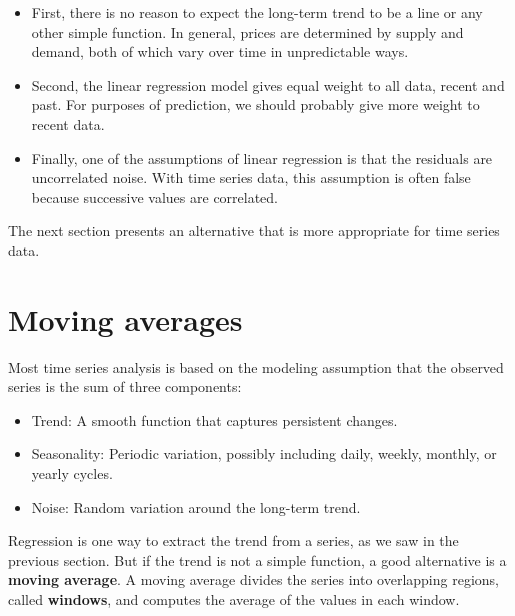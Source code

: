 \documentclass[12pt]{book}
\theoremstyle{exercise}
\begin{document}
\begin{itemize}

\item First, there is no reason to expect the long-term trend to be a
  line or any other simple function.  In general, prices are
  determined by supply and demand, both of which vary over time in
  unpredictable ways.%

\item Second, the linear regression model gives equal weight to all
  data, recent and past.  For purposes of prediction, we should
  probably give more weight to recent data.%

\item Finally, one of the assumptions of linear regression is that the
  residuals are uncorrelated noise.  With time series data, this
  assumption is often false because successive values are correlated.%

\end{itemize}

The next section presents an alternative that is more appropriate
for time series data.


\section{Moving averages}

Most time series analysis is based on the modeling assumption that the
observed series is the sum of three components:%
%

\begin{itemize}

\item Trend: A smooth function that captures persistent changes.%

\item Seasonality: Periodic variation, possibly including daily,
weekly, monthly, or yearly cycles.%

\item Noise: Random variation around the long-term trend.%

\end{itemize}

Regression is one way to extract the trend from a series, as we
saw in the previous section.  But if the trend is not a simple
function, a good alternative is a {\bf moving average}.  A moving
average divides the series into overlapping regions, called {\bf windows},
and computes the average of the values in each window.%
\end{document}
